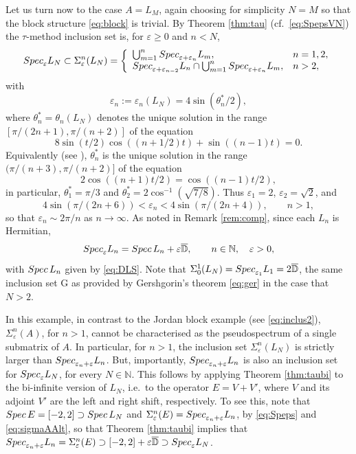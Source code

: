\documentclass[preprint,1p,11pt]{elsarticle}
\newcommand\D{{\mathbb D}}
\newcommand\N{{\mathbb N}}
\newcommand\eps{{\varepsilon}}
\newcommand\Spec{{\rm Spec}\,}  %
\newcommand\Specn{{\rm Spec}}   %
\newcommand\Speps{{\rm Spec}_\eps}
\numberwithin{equation}{section}   %
\numberwithin{figure}{section}  %
\begin{document}
Let us turn now to the case $A=L_M$, again choosing for simplicity $N=M$ so that the block structure \eqref{eq:block} is trivial.
By Theorem \ref{thm:tau} (cf.~\eqref{eq:SpepsVN}) the $\tau$-method inclusion set is, for $\eps\geq 0$ and $n<N$,
\begin{equation} \label{eq:SpepsLN}
\Speps L_N\subset \Sigma_\eps^n(L_N) = \left\{\begin{array}{ll}\bigcup_{m=1}^n  \Specn_{\eps+ \eps_{n}}L_m, & n=1,2,\\
\Specn_{\eps+ \eps_{n-2}} L_n \cap \bigcup_{m=1}^n  \Specn_{\eps+ \eps_{n}}L_m, &n>2,\end{array}\right. 
\end{equation}
with 
$$
\eps_n := \eps_n(L_N) = 4\sin(\theta_n^{*}/2),
$$
where $\theta_n^{*} = \theta_n(L_N)$ denotes the unique solution in the range $[\pi/(2n+1),\pi/(n+2)]$ of the equation 
$$
8\sin(t/2)\cos((n+1/2)t) +\sin((n-1)t)=0.
$$
Equivalently (see \cite[\S3.2]{CW.Heng.ML:SpecIncl1}), $\theta_n^{*}$ is the unique solution in the range $(\pi/(n+3),\pi/(n+2)]$ of the equation
\begin{equation}\label{equi1s}
2\cos((n+1)t/2) = \cos((n-1)t/2),
\end{equation}
in particular, $\theta^{*}_1=\pi/3$ and $\theta^{*}_2=2\cos^{-1}(\sqrt{7/8})$.
Thus $\eps_1 =2$, $\eps_2=\sqrt{2}$, and
$$
4\sin(\pi/(2n+6)) < \eps_n < 4\sin(\pi/(2n+4)), \qquad n>1,
$$
so that $\eps_n\sim 2\pi/n$ as $n\to\infty$. As noted in Remark \ref{rem:comp}, since each $L_n$ is Hermitian,
\begin{equation} \label{eq:SpepsLn}
\Speps L_n = \Spec L_n + \eps \overline{\D}, \qquad n\in \N, \quad \eps>0,
\end{equation}
with $\Spec L_n$ given by \eqref{eq:DLS}. Note that $\Sigma_0^1(L_N)=\Specn_{\eps_1}L_1=2\overline{\D}$, the same inclusion set G as provided by Gershgorin's theorem \eqref{eq:ger} in the case that $N>2$. 

In this example, in contrast to the Jordan block example (see \eqref{eq:inclus2}),  $\Sigma^n_\eps(A)$, for $n>1$, cannot be characterised as the pseudospectrum of a single submatrix of $A$. %
In particular, for $n>1$, the inclusion set $\Sigma^n_{\eps}(L_N)$ is strictly larger than $\Specn_{\eps_n+\eps} L_n$. But, importantly, $\Specn_{\eps_n+\eps} L_n$ is also an inclusion set for $\Speps L_N$, for every $N\in \N$. This follows by applying Theorem \ref{thm:taubi} to the bi-infinite version of $L_N$, i.e.\ to the operator $E=V+V'$, where $V$ and its adjoint $V'$ are the left and right shift, respectively. To see this, note that $\Spec E=[-2,2]\supset \Spec L_N$ and $\Sigma^n_{\eps}(E) = \Specn_{\eps_n+\eps} L_n$, by \eqref{eq:Speps} and \eqref{eq:sigmaAAlt}, so that Theorem \ref{thm:taubi} implies that 
$\Specn_{\eps_n+\eps} L_n= \Sigma^n_{\eps}(E)\supset [-2,2]+\eps{\overline \D} \supset \Speps L_N$.
\end{document}
